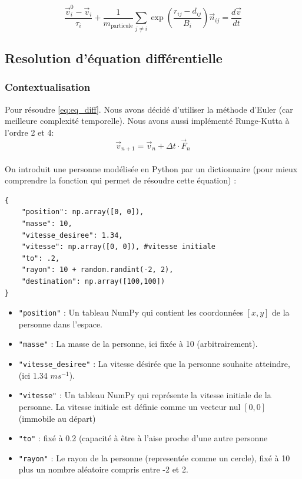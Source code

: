\documentclass[a4paper,12pt]{article}
\begin{document}
\begin{equation}
\label{eq:eq_diff}
\frac{\vec{v}_i^0 - \vec{v}_i}{\tau_i} + \frac{1}{m_{\text{particule}}} \sum_{j \neq i}  \exp\left( \frac{r_{ij} - d_{ij}}{B_i} \right) \vec{n}_{ij} = \frac{d\vec{v}}{dt}
\end{equation}

\subsection{Resolution d'équation différentielle}
\subsubsection{Contextualisation}

\indent Pour résoudre \eqref{eq:eq_diff}. Nous avons décidé d'utiliser la méthode d'Euler (car meilleure complexité temporelle). Nous avons aussi implémenté Runge-Kutta à l'ordre 2 et 4:
\[
\vec{v}_{n+1} = \vec{v}_n + \Delta t \cdot \vec{F}_n
\]
\\ On introduit une personne modélisée en Python par un dictionnaire (pour mieux comprendre  la fonction qui permet de résoudre cette équation) :

\begin{verbatim}
{
	"position": np.array([0, 0]),
	"masse": 10,
	"vitesse_desiree": 1.34, 
	"vitesse": np.array([0, 0]), #vitesse initiale
	"to": .2,
	"rayon": 10 + random.randint(-2, 2),
	"destination": np.array([100,100])
} 
\end{verbatim}

\begin{itemize}
    \item \texttt{"position"} : Un tableau NumPy qui contient les coordonnées \([x, y]\) de la personne dans l'espace. 
    
    \item \texttt{"masse"} : La masse de la personne, ici fixée à 10 (arbitrairement).
    
    \item \texttt{"vitesse\_desiree"} : La vitesse désirée que la personne souhaite atteindre, (ici 1.34 $ms^{-1}$).
    
    \item \texttt{"vitesse"} : Un tableau NumPy qui représente la vitesse initiale de la personne. La vitesse initiale est définie comme un vecteur nul \([0, 0]\) (immobile au départ)
    
    \item \texttt{"to"} : fixé à 0.2 (capacité à être à l'aise proche d'une autre personne
    
    \item \texttt{"rayon"} : Le rayon de la personne (representée comme un cercle), fixé à  10 plus un nombre aléatoire compris entre -2 et 2. 
\end{itemize}
\end{document}
